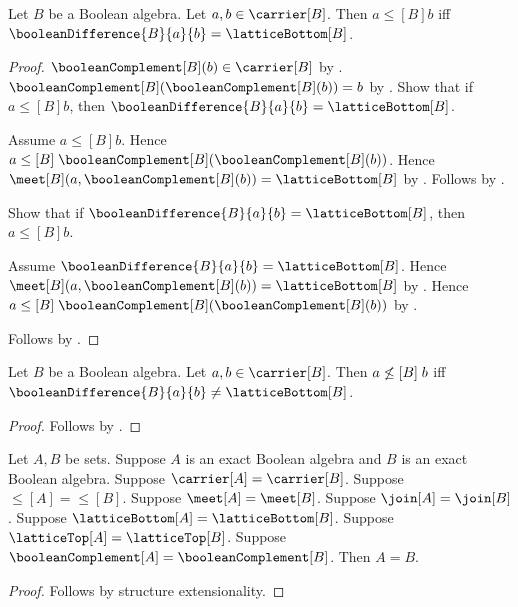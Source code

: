 \begin{theorem}\label{leq_iff_boolean_difference_lattice_bottom}
    Let $B$ be a Boolean algebra.
    Let $a,b\in\carrier[B]$.
    Then $a\mathrel{\leq[B]}b$ iff
        $\booleanDifference{B}{a}{b}=\latticeBottom[B]$.
\end{theorem}
\begin{proof}
    $\booleanComplement[B](b)\in\carrier[B]$ by
        .
    $\booleanComplement[B](\booleanComplement[B](b))=b$ by
        .
    Show that if $a\mathrel{\leq[B]}b$, then
        $\booleanDifference{B}{a}{b}=\latticeBottom[B]$.
    \begin{subproof}
        Assume $a\mathrel{\leq[B]}b$.
        Hence $a\mathrel{\leq[B]}
            \booleanComplement[B](\booleanComplement[B](b))$.
        Hence $\meet[B](a,\booleanComplement[B](b))
            =\latticeBottom[B]$ by
            .
        Follows by .
    \end{subproof}
    Show that if $\booleanDifference{B}{a}{b}=\latticeBottom[B]$,
        then $a\mathrel{\leq[B]}b$.
    \begin{subproof}
        Assume $\booleanDifference{B}{a}{b}=\latticeBottom[B]$.
        Hence $\meet[B](a,\booleanComplement[B](b))
            =\latticeBottom[B]$ by .
        Hence $a\mathrel{\leq[B]}
            \booleanComplement[B](\booleanComplement[B](b))$ by
            .
    \end{subproof}
    Follows by \auto.
\end{proof}

\begin{theorem}\label{not_leq_iff_boolean_difference_nonbottom}
    Let $B$ be a Boolean algebra.
    Let $a,b\in\carrier[B]$.
    Then $a\not\mathrel{\leq[B]}b$ iff
        $\booleanDifference{B}{a}{b}\neq\latticeBottom[B]$.
\end{theorem}
\begin{proof}
    Follows by
        .
\end{proof}

\begin{theorem}\label{exact_boolean_algebra_extensionality}
    Let $A,B$ be sets.
    Suppose $A$ is an exact Boolean algebra and
        $B$ is an exact Boolean algebra.
    Suppose $\carrier[A]=\carrier[B]$.
    Suppose $\leq[A]=\leq[B]$.
    Suppose $\meet[A]=\meet[B]$.
    Suppose $\join[A]=\join[B]$.
    Suppose $\latticeBottom[A]=\latticeBottom[B]$.
    Suppose $\latticeTop[A]=\latticeTop[B]$.
    Suppose $\booleanComplement[A]=\booleanComplement[B]$.
    Then $A=B$.
\end{theorem}
\begin{proof}
    Follows by structure extensionality.
\end{proof}
